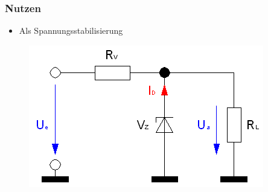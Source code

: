 \begin{frame}
    \frametitle{Nutzen}
      	\begin{itemize}
			\item Als Spannungsstabilisierung
    \end{itemize}    
    \begin{center}
	\begin{figure}
        \includegraphics[width=.8\textwidth,height=.6\textheight,keepaspectratio]{e12/Spannungsstabilisierung.png}
	\end{figure}
	\end{center}
\end{frame}
